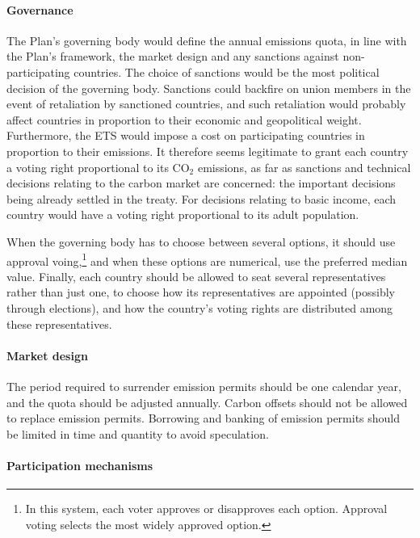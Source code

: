 \documentclass[a5paper,english,openany]{memoir}
\begin{document}
\paragraph{Governance} 
The Plan's governing body would define the annual emissions quota, in line with the Plan's framework, %
the market design and any sanctions against non-participating countries. %
The choice of sanctions would be the most political decision of the governing body. Sanctions could backfire on union members in the event of retaliation by sanctioned countries, and such retaliation would probably affect countries in proportion to their economic and geopolitical weight. 
Furthermore, the ETS would impose a cost on participating countries in proportion to their emissions. It therefore seems legitimate to grant each country a voting right proportional to its CO$_\text{2}$ emissions, as far as sanctions and technical decisions relating to the carbon market are concerned: the important decisions being already settled in the treaty. %
For decisions relating to basic income, each country would have a voting right proportional to its adult population. 

When the governing body has to choose between several options, it should use approval voing,\footnote{In this system, each voter approves or disapproves each option. Approval voting selects the most widely approved option.} and when these options are numerical, use the preferred median value. Finally, each country should be allowed to seat several representatives rather than just one, to choose how its representatives are appointed (possibly through elections), and how the country's voting rights are distributed among these representatives. 


\paragraph{Market design} 
The period required to surrender emission permits should be one calendar year, and the quota should be adjusted annually. Carbon offsets should not be allowed to replace emission permits. Borrowing and banking of emission permits should be limited in time and quantity to avoid speculation. %

\paragraph{Participation mechanisms}
\end{document}
